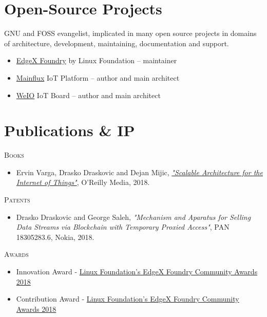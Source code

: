 \documentclass[8pt, a4paper, oneside, final]{scrartcl}
\begin{document}
\begin{minipage}[t]{0.45\linewidth}
  \section{Open-Source Projects}
    GNU and FOSS evangelist, implicated in many open source projects in domains of
    architecture, development, maintaining, documentation and support.

    \begin{itemize}
      \item \href{https://www.edgexfoundry.org}{EdgeX Foundry} by Linux Foundation -- maintainer
      \item \href{https://github.com/Mainflux/mainflux}{Mainflux} IoT Platform -- author and main architect
      \item \href{http://www.we-io.net}{WeIO} IoT Board -- author and main architect
    \end{itemize}

  \section{Publications \& IP}
    \faBook \hspace{1mm} \textsc{Books}
    \begin{itemize}
      \item  Ervin Varga, Drasko Draskovic and Dejan Mijic, \href{http://www.oreilly.com/programming/free/scalable-architecture-for-the-internet-of-things.csp}
        {\textit{"Scalable Architecture for the Internet of Things"}},  O'Reilly Media, 2018.
    \end{itemize}

    \medskip

    \faFileTextO \hspace{1mm} \textsc{Patents}
    \begin{itemize}
      \item Drasko Draskovic and George Saleh, \textit{"Mechanism and Aparatus for Selling Data Streams via Blockchain with Temporary Proxied Access"},
        PAN 18305283.6, Nokia, 2018.
    \end{itemize}

    \medskip

    \faTrophy \hspace{1mm} \textsc{Awards}
    \begin{itemize}
      \item Innovation Award - \href{https://www.edgexfoundry.org/blog/2018/04/24/happy-1st-anniversary-edgex-foundry}{Linux Foundation's EdgeX Foundry Community Awards 2018}
      \item Contribution Award - \href{https://www.edgexfoundry.org/blog/2018/04/24/happy-1st-anniversary-edgex-foundry}{Linux Foundation's EdgeX Foundry Community Awards 2018}
    \end{itemize}


\end{minipage}
\end{document}
